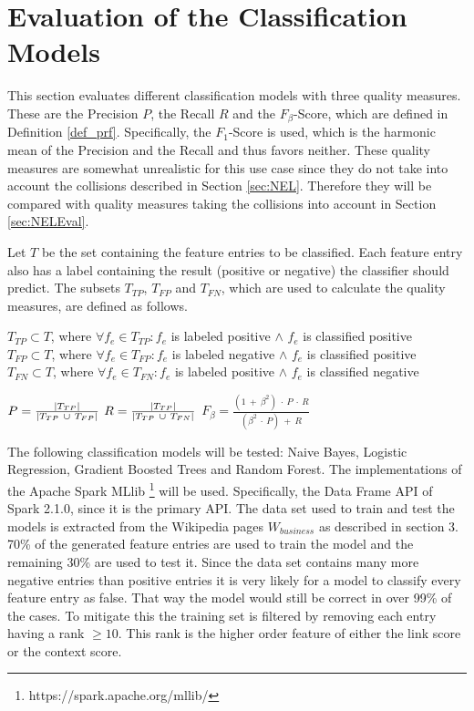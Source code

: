 \section{Evaluation of the Classification Models}
\label{sec:ModelEval}
This section evaluates different classification models with three quality measures. These are the Precision $P$, the Recall $R$ and the $F_{\beta}$-Score, which are defined in Definition \ref{def_prf}. Specifically, the $F_1$-Score is used, which is the harmonic mean of the Precision and the Recall and thus favors neither. These quality measures are somewhat unrealistic for this use case since they do not take into account the collisions described in Section \ref{sec:NEL}. Therefore they will be compared with quality measures taking the collisions into account in Section \ref{sec:NELEval}.\par
Let $T$ be the set containing the feature entries to be classified. Each feature entry also has a label containing the result (positive or negative) the classifier should predict. The subsets $T_{TP}$, $T_{FP}$ and $T_{FN}$, which are used to calculate the quality measures, are defined as follows.\\
\begin{nscenter}
	$T_{TP} \subset T$, where $\forall f_e \in T_{TP}: f_e$ is labeled positive $\land$ $f_e$ is classified positive\\
	$T_{FP} \subset T$, where $\forall f_e \in T_{FP}: f_e$ is labeled negative $\land$ $f_e$ is classified positive\\
	$T_{FN} \subset T$, where $\forall f_e \in T_{FN}: f_e$ is labeled positive $\land$ $f_e$ is classified negative\\
\end{nscenter}
\begin{definition}
$P = \frac{\left|T_{TP}\right|}{\left|T_{TP} \ \cup \ T_{FP}\right|}$
$R = \frac{\left|T_{TP}\right|}{\left|T_{TP} \ \cup \ T_{FN}\right|}$
$F_{\beta} = \frac{(1 \ + \ \beta^2) \ \cdot \ P \ \cdot \ R}{(\beta^2 \ \cdot \ P) \ + \ R}$
\label{def_prf}
\end{definition}
The following classification models will be tested: Naive Bayes, Logistic Regression, Gradient Boosted Trees and Random Forest. The implementations of the Apache Spark MLlib \footnote{https://spark.apache.org/mllib/} will be used. Specifically, the Data Frame API of Spark 2.1.0, since it is the primary API. The data set used to train and test the models is extracted from the Wikipedia pages $W_{business}$ as described in section 3. 70\% of the generated feature entries are used to train the model and the remaining 30\% are used to test it. Since the data set contains many more negative entries than positive entries it is very likely for a model to classify every feature entry as false. That way the model would still be correct in over 99\% of the cases. To mitigate this the training set is filtered by removing each entry having a rank $\geq 10$. This rank is the higher order feature of either the link score or the context score.\par
